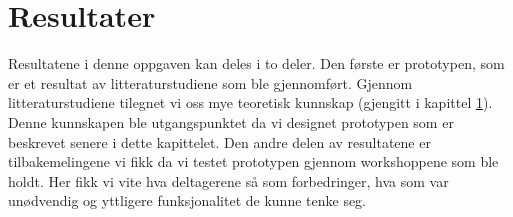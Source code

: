 \chapter{Resultater}
\label{chp:resultater}

Resultatene i denne oppgaven kan deles i to deler. Den første er prototypen, som er et resultat av litteraturstudiene som ble gjennomført. Gjennom litteraturstudiene tilegnet vi oss mye teoretisk kunnskap (gjengitt i kapittel \ref{chp:resultater}). Denne kunnskapen ble utgangspunktet da vi designet prototypen som er beskrevet senere i dette kapittelet. Den andre delen av resultatene er tilbakemelingene vi fikk da vi testet prototypen gjennom workshoppene som ble holdt. Her fikk vi vite hva deltagerene så som forbedringer, hva som var unødvendig og yttligere funksjonalitet de kunne tenke seg. 